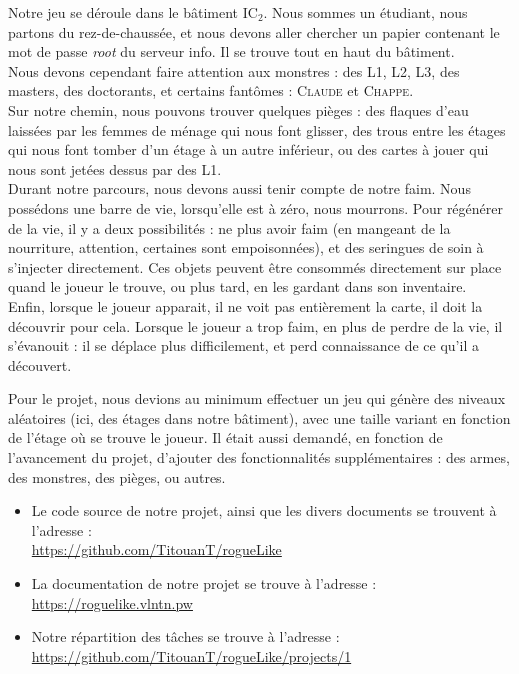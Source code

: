 \documentclass[11pt]{report}
\begin{document}
	Notre jeu se déroule dans le bâtiment IC$_2$. Nous sommes un étudiant, nous partons du rez-de-chaussée, et nous devons aller chercher un papier contenant le mot de passe \emph{root} du serveur info. Il se trouve tout en haut du bâtiment. \\
	Nous devons cependant faire attention aux monstres : des L1, L2, L3, des masters, des doctorants, et certains fantômes : \textsc{Claude} et \textsc{Chappe}.\\
	Sur notre chemin, nous pouvons trouver quelques pièges : des flaques d'eau laissées par les femmes de ménage qui nous font glisser, des trous entre les étages qui nous font tomber d'un étage à un autre inférieur, ou des cartes à jouer qui nous sont jetées dessus par des L1.\\
	Durant notre parcours, nous devons aussi tenir compte de notre faim. Nous possédons une barre de vie, lorsqu'elle est à zéro, nous mourrons. Pour régénérer de la vie, il y a deux possibilités : ne plus avoir faim (en mangeant de la nourriture, attention, certaines sont empoisonnées), et des seringues de soin à s'injecter directement. Ces objets peuvent être consommés directement sur place quand le joueur le trouve, ou plus tard, en les gardant dans son inventaire.\\
	Enfin, lorsque le joueur apparait, il ne voit pas entièrement la carte, il doit la découvrir pour cela. Lorsque le joueur a trop faim, en plus de perdre de la vie, il s'évanouit : il se déplace plus difficilement, et perd connaissance de ce qu'il a découvert.
	
	\vspace{12pt}
	
	Pour le projet, nous devions au minimum effectuer un jeu qui génère des niveaux aléatoires (ici, des étages dans notre bâtiment), avec une taille variant en fonction de l'étage où se trouve le joueur. Il était aussi demandé, en fonction de l'avancement du projet, d'ajouter des fonctionnalités supplémentaires : des armes, des monstres, des pièges, ou autres.
	
	\vspace{12pt}
	
	\begin{itemize}
	\item Le code source de notre projet, ainsi que les divers documents se trouvent à l'adresse :\\
		\hspace*{1cm} \href{https://github.com/TitouanT/rogueLike}{https://github.com/TitouanT/rogueLike}
	 \item La documentation de notre projet se trouve à l'adresse :\\
	 	\hspace*{1cm} \href{https://roguelike.vlntn.pw}{https://roguelike.vlntn.pw}
	 \item Notre répartition des tâches se trouve à l'adresse :\\
	 	\hspace*{1cm} \href{https://github.com/TitouanT/rogueLike/projects/1}{https://github.com/TitouanT/rogueLike/projects/1}
	\end{itemize}
\end{document}
